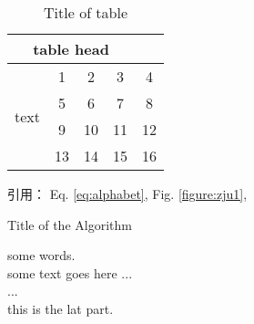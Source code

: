 \documentclass[UTF8,a4paper,10pt]{ctexart}
\begin{document}
    \begin{table}[htbp]
		\caption{Title of table} \label{tab:table}
		\centering
		\addtolength{\tabcolsep}{-0mm} %
		\begin{tabular}{ccccc}
			\toprule[0.75pt]	%
			\multicolumn{4}{c}{table head} \\
			\midrule[0.5pt]	%
			\multirow{4}{*}{text} & 1 & 2 & 3 & 4 \\  %
			& 5 & 6 & 7 & 8 \\
			\cmidrule[0.5pt]{2-4}	%
			& 9 & 10 & 11 & 12 \\
			& 13 & 14 & 15 & 16 \\
			\bottomrule[0.75pt]	%
		\end{tabular}
	\end{table}
    引用： Eq. \eqref{eq:alphabet}, Fig. \ref{figure:zju1},  \\
    
 
    \begin{algorithm}
		\caption{Title of the Algorithm}
		\label{algo:ref}
		\begin{algorithmic}[1]
			\REQUIRE some words.  %
			\ENSURE ~\\           %
			some text goes here ... \\
			\STATE ... \\  %
			\ENDWHILE
			\RETURN this is the lat part.  %
		\end{algorithmic}
	\end{algorithm}
 
 


\end{document}
